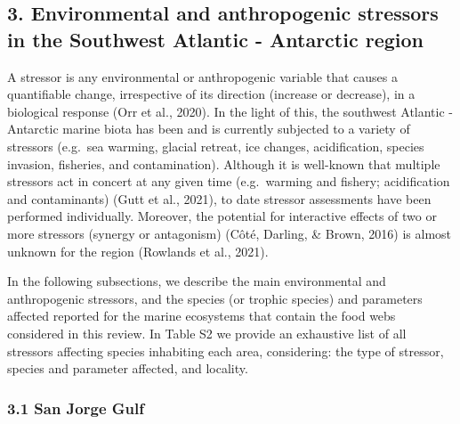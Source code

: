 \documentclass[
]{article}
\begin{document}
\normalsize

\subsection{3. Environmental and anthropogenic stressors in the
Southwest Atlantic - Antarctic
region}\label{environmental-and-anthropogenic-stressors-in-the-southwest-atlantic---antarctic-region}

A stressor is any environmental or anthropogenic variable that causes a
quantifiable change, irrespective of its direction (increase or
decrease), in a biological response (Orr et al., 2020). In the light of
this, the southwest Atlantic - Antarctic marine biota has been and is
currently subjected to a variety of stressors (e.g.~sea warming, glacial
retreat, ice changes, acidification, species invasion, fisheries, and
contamination). Although it is well-known that multiple stressors act in
concert at any given time (e.g.~warming and fishery; acidification and
contaminants) (Gutt et al., 2021), to date stressor assessments have
been performed individually. Moreover, the potential for interactive
effects of two or more stressors (synergy or antagonism) (Côté, Darling,
\& Brown, 2016) is almost unknown for the region (Rowlands et al.,
2021).

In the following subsections, we describe the main environmental and
anthropogenic stressors, and the species (or trophic species) and
parameters affected reported for the marine ecosystems that contain the
food webs considered in this review. In Table S2 we provide an
exhaustive list of all stressors affecting species inhabiting each area,
considering: the type of stressor, species and parameter affected, and
locality.

\subsubsection{3.1 San Jorge Gulf}\label{san-jorge-gulf}
\end{document}
